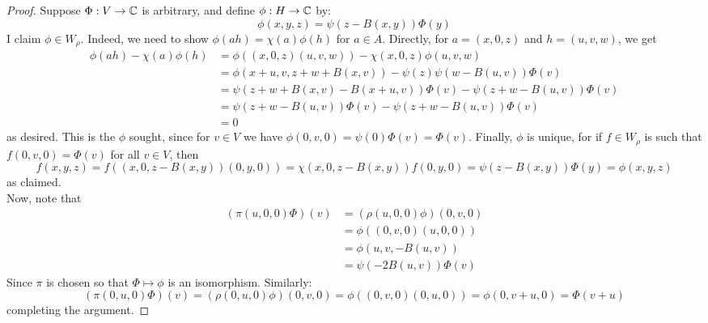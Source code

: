 \begin{proof}
	Suppose $\Phi : V \to \mathbb{C}$ is arbitrary, and define $\phi : H \to \mathbb{C}$ by:
	\[ \phi(x,y,z) = \psi(z-B(x,y))\Phi(y) \]
	I claim $\phi \in W_\rho$. Indeed, we need to show $\phi(ah) = \chi(a)\phi(h)$ for $a \in A$. Directly, for $a = (x,0,z)$ and $h = (u,v,w)$, we get
	\begin{align*}
	\phi(ah) - \chi(a)\phi(h)
		&= \phi((x,0,z)(u,v,w)) - \chi(x,0,z)\phi(u,v,w) \\
		&= \phi(x+u,v,z+w+B(x,v)) - \psi(z)\psi(w-B(u,v))\Phi(v) \\
		&= \psi(z+w+B(x,v)-B(x+u,v))\Phi(v) - \psi(z+w-B(u,v))\Phi(v) \\
		&= \psi(z+w-B(u,v))\Phi(v) - \psi(z+w-B(u,v))\Phi(v) \\
		&= 0
	\end{align*}
	as desired. This is the $\phi$ sought, since for $v \in V$ we have $\phi(0,v,0) = \psi(0)\Phi(v) = \Phi(v)$. Finally, $\phi$ is unique, for if $f \in W_\rho$ is such that $f(0,v,0) = \Phi(v)$ for all $v \in V$, then
	\[ f(x,y,z) = f((x,0,z-B(x,y))(0,y,0)) = \chi(x,0,z-B(x,y))f(0,y,0) = \psi(z-B(x,y))\Phi(y) = \phi(x,y,z) \]
	as claimed. \\
	
	Now, note that
	\begin{align*}
	(\pi(u,0,0)\Phi)(v)
		&= (\rho(u,0,0)\phi)(0,v,0) \\
		&= \phi((0,v,0)(u,0,0)) \\
		&= \phi(u,v,-B(u,v)) \\
		&= \psi(-2B(u,v))\Phi(v)
	\end{align*}
	Since $\pi$ is chosen so that $\Phi \mapsto \phi$ is an isomorphism. Similarly:
	\[ (\pi(0,u,0)\Phi)(v) = (\rho(0,u,0)\phi)(0,v,0) = \phi((0,v,0)(0,u,0)) = \phi(0,v+u,0) = \Phi(v+u) \]
	completing the argument.
\end{proof}
